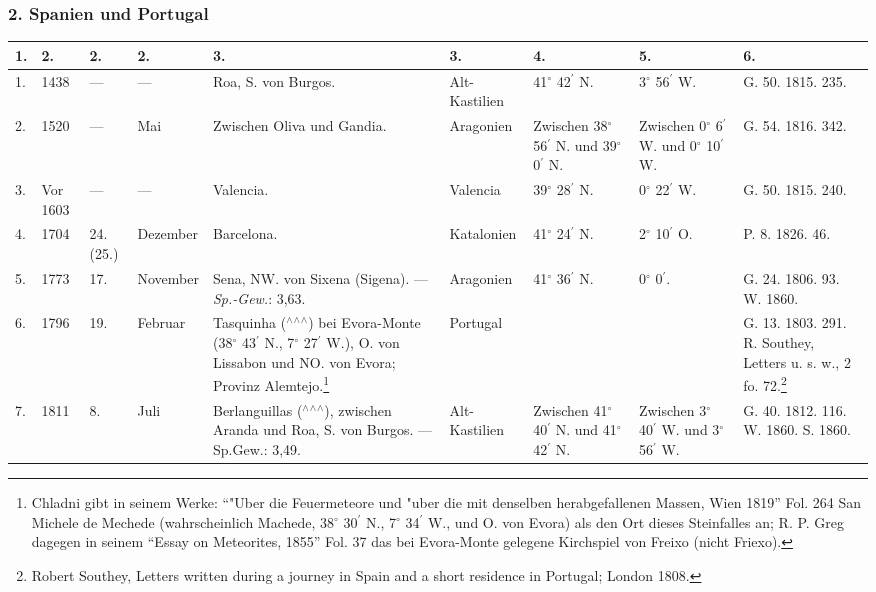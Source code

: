 \documentclass[a4paper, 8pt, oneside, polutonikogreek, german]{article}
\begin{document}
\subsubsection{2. Spanien und Portugal}
\begin{center}
    \footnotesize
    \begin{longtable}{|p{3mm}|p{5mm}|p{5mm}|p{11mm}|p{25mm}|p{17mm}|p{11mm}|p{11mm}|p{11mm}|}
    \hline
        1. & 2. & 2. & 2. & 3. & 3. & 4. & 5. & 6. \\ \hline
        1. & 1438 & --- & --- & Roa, S. von Burgos. & Alt-Kastilien & 41$^\circ$ 42$^\prime$ N. & 3$^\circ$ 56$^\prime$ W. & G. 50. 1815. 235. \\ \hline
        2. & 1520 & --- & Mai & Zwischen Oliva und Gandia. & Aragonien & Zwischen 38$^\circ$ 56$^\prime$ N. und 39$^\circ$ 0$^\prime$ N. & Zwischen 0$^\circ$ 6$^\prime$ W. und 0$^\circ$ 10$^\prime$ W. & G. 54. 1816. 342. \\ \hline
        3. & Vor 1603 & --- & --- & Valencia. & Valencia & 39$^\circ$ 28$^\prime$ N. & 0$^\circ$ 22$^\prime$ W. & G. 50. 1815. 240. \\ \hline
        4. & 1704 & 24. (25.) & Dezember & Barcelona. & Katalonien & 41$^\circ$ 24$^\prime$ N. & 2$^\circ$ 10$^\prime$ O. & P. 8. 1826. 46. \\ \hline
        5. & 1773 & 17. & November & Sena, NW. von Sixena (Sigena). --- \emph{Sp.-Gew.}: 3,63. & Aragonien & 41$^\circ$ 36$^\prime$ N. & 0$^\circ$ 0$^\prime$. & G. 24. 1806. 93. W. 1860. \\ \hline
        6. & 1796 & 19. & Februar & Tasquinha ($^\wedge$$^\wedge$$^\wedge$) bei Evora-Monte (38$^\circ$ 43$^\prime$ N., 7$^\circ$ 27$^\prime$ W.), O. von Lissabon und NO. von Evora; Provinz Alemtejo.\footnote{Chladni gibt in seinem Werke: "`"Uber die Feuermeteore und "uber die mit denselben herabgefallenen Massen, Wien 1819"' Fol. 264 San Michele de Mechede (wahrscheinlich Machede, 38$^\circ$ 30$^\prime$ N., 7$^\circ$ 34$^\prime$ W., und O. von Evora) als den Ort dieses Steinfalles an; R. P. Greg dagegen in seinem "`Essay on Meteorites, 1855"' Fol. 37 das bei Evora-Monte gelegene Kirchspiel von Freixo (nicht Friexo).} & Portugal & ~ & ~ & G. 13. 1803. 291. R. Southey, Letters u. s. w., 2 fo. 72.\footnote{Robert Southey, Letters written during a journey in Spain and a short residence in Portugal; London 1808.} \\ \hline
        7. & 1811 & 8. & Juli & Berlanguillas ($^\wedge$$^\wedge$$^\wedge$), zwischen Aranda und Roa, S. von Burgos. --- Sp.Gew.: 3,49. & Alt-Kastilien & Zwischen 41$^\circ$ 40$^\prime$ N. und 41$^\circ$ 42$^\prime$ N. & Zwischen 3$^\circ$ 40$^\prime$ W. und 3$^\circ$ 56$^\prime$ W. & G. 40. 1812. 116. W. 1860. S. 1860. \\ \hline

\end{longtable}
\end{center}
\end{document}
